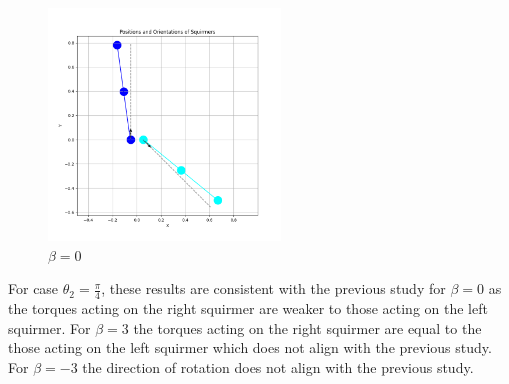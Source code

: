 \documentclass{article}
\begin{document}
\begin{figure}[H]
    \centering
    \includegraphics[width=0.55\textwidth]{graphs/simulations/sim_sq_sq/beta0/mpi_4_.png}
    \caption{\footnotesize $\beta = 0$}
\end{figure}
For case $\theta_2 = \frac{\pi}{4}$, these results are consistent with the previous study\cite{Stark} for $\beta = 0$ as the torques acting on the right 
squirmer are weaker to those acting on the left squirmer. For $\beta = 3$ the torques acting on the right squirmer are
equal to the those acting on the left squirmer which does not align with the previous study.
For $\beta = -3$ the direction of rotation does not align with the previous study.
\\
\\
\end{document}
